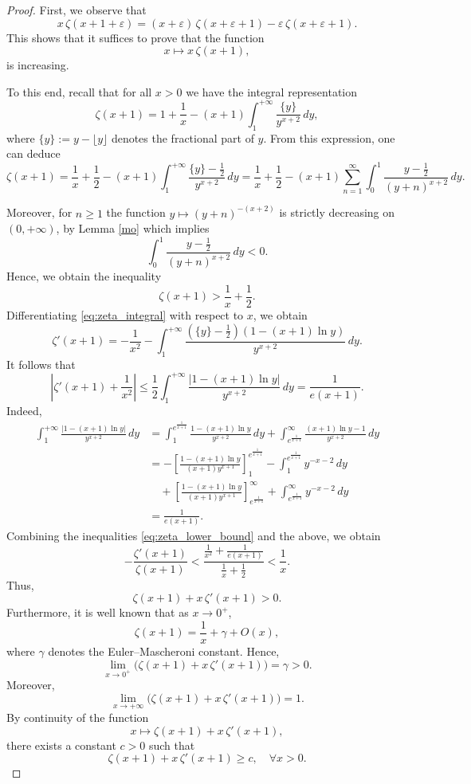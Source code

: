 \documentclass[10pt,a4paper]{amsart}
\begin{document}
\begin{proof}
First, we observe that
\[
x\, \zeta(x + 1 + \varepsilon) = (x + \varepsilon)\, \zeta(x + \varepsilon + 1) - \varepsilon \, \zeta(x + \varepsilon + 1).
\]
This shows that it suffices to prove that the function
\[
x \longmapsto x \, \zeta(x + 1),
\]
is increasing.  

To this end, recall that for all $x > 0$ we have the integral representation
\begin{equation} \label{eq:zeta_integral}
\zeta(x + 1) = 1 + \frac{1}{x} - (x + 1) \int_1^{+\infty} \frac{\{y\}}{y^{x+2}} \, dy,
\end{equation}
where $\{y\} := y - \lfloor y \rfloor$ denotes the fractional part of $y$. From this expression, one can deduce
\[
\zeta(x + 1) = \frac{1}{x} + \frac{1}{2} - (x + 1) \int_1^{+\infty} \frac{\{y\} - \frac{1}{2}}{y^{x+2}} \, dy=\frac{1}{x} + \frac{1}{2} - (x + 1) \sum_{n=1}^{\infty}\int_0^{1} \frac{y - \frac{1}{2}}{(y+n)^{x+2}} \, dy.
\]

Moreover, for $n\geq 1$ the function $y \mapsto (y+n)^{-(x+2)}$ is strictly decreasing on $(0, +\infty)$, by Lemma \ref{mo} which implies
\[
\int_0^1 \frac{y - \frac{1}{2}}{(y+n)^{x+2}} \, dy < 0.
\]
Hence, we obtain the inequality
\begin{equation} \label{eq:zeta_lower_bound}
\zeta(x + 1) > \frac{1}{x} + \frac{1}{2}.
\end{equation}
Differentiating \eqref{eq:zeta_integral} with respect to $x$, we obtain
\[
\zeta'(x + 1) = - \frac{1}{x^2} - \int_1^{+\infty} \frac{(\{y\} - \frac{1}{2}) \left(1 - (x + 1) \ln y \right)}{y^{x+2}} \, dy.
\]
It follows that
\[
\left| \zeta'(x + 1) + \frac{1}{x^2} \right|
\le \frac{1}{2} \int_1^{+\infty}
\frac{\lvert 1 - (x + 1)\ln y \rvert}{y^{x+2}} \, dy
= \frac{1}{e(x+1)}.
\]
Indeed,
\begin{align*}
\int_1^{+\infty} \frac{|1 - (x + 1) \ln y|}{y^{x+2}} \, dy
&= \int_1^{e^{\frac{1}{x+1}}}
\frac{1 - (x + 1) \ln y}{y^{x+2}} \, dy
+ \int_{e^{\frac{1}{x+1}}}^{\infty}
\frac{(x + 1) \ln y - 1}{y^{x+2}} \, dy \\
&= -\left[\frac{1 - (x+1)\ln y}{(x+1)y^{x+1}}\right]_1^{e^{\frac{1}{x+1}}}
- \int_1^{e^{\frac{1}{x+1}}} y^{-x-2} \, dy \\
&\quad
+ \left[\frac{1 - (x+1)\ln y}{(x+1)y^{x+1}}\right]_{e^{\frac{1}{x+1}}}^{\infty}
+ \int_{e^{\frac{1}{x+1}}}^{\infty} y^{-x-2} \, dy \\
&= \frac{1}{e(x+1)}.
\end{align*}
Combining the inequalities \eqref{eq:zeta_lower_bound} and the above, we obtain
\[
- \frac{\zeta'(x + 1)}{\zeta(x + 1)} < \frac{\frac{1}{x^2} + \frac{1}{e(x+1)}}{\frac{1}{x} + \frac{1}{2}} < \frac{1}{x}.
\]
Thus,
\[
\zeta(x + 1) + x \, \zeta'(x + 1) > 0.
\]
Furthermore, it is well known that as $x \to 0^+$,
\[
\zeta(x + 1) = \frac{1}{x} + \gamma + O(x),
\]
where $\gamma$ denotes the Euler–Mascheroni constant. Hence,
\[
\lim_{x \to 0^+} \big( \zeta(x + 1) + x \, \zeta'(x + 1) \big) = \gamma > 0.
\]
Moreover,
\[
\lim_{x \to +\infty} \big( \zeta(x + 1) + x \, \zeta'(x + 1) \big) = 1.
\]
By continuity of the function
\[
x \longmapsto \zeta(x + 1) + x \, \zeta'(x + 1),
\]
there exists a constant $c > 0$ such that
\[
\zeta(x + 1) + x \, \zeta'(x + 1) \ge c, \quad \forall x > 0.
\]
\end{proof}
\end{document}
